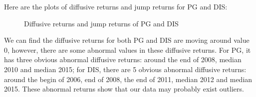 \documentclass[12pt,letterpaper]{article}
\begin{document}
\begin{enumerate}[label=\textbf{(\Alph*)}]
 Here are the plots of diffusive returns and jump returns for PG and DIS:
   \begin{figure}[H]
            \centering
            \caption{Diffusive returns and jump returns of PG and DIS}
\end{figure}

We can find the diffusive returns for both PG and DIS are moving around value 0, however, there are some abnormal values in these diffusive returns. For PG, it has three obvious abnormal diffusive returns: around the end of 2008, median 2010 and median 2015; for DIS, there are 5 obvious abnormal diffusive returns: around the begin of 2006, end of 2008, the end of 2011, median 2012 and median 2015. These abnormal returns show that our data may probably exist outliers. \\


\end{enumerate}
\end{document}
